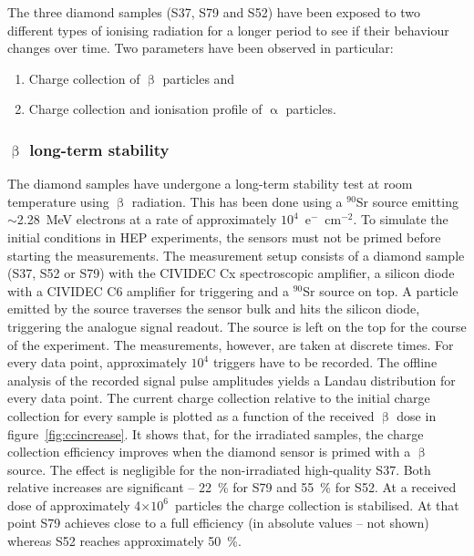The three diamond samples (S37, S79 and S52) have been exposed to two different types of ionising radiation for a longer period to see if their behaviour changes over time. Two parameters have been observed in particular: 
\begin{enumerate}
\item Charge collection of $\upbeta$ particles and 
\item Charge collection and ionisation profile of $\upalpha$ particles.
\end{enumerate}

\subsubsection{$\upbeta$ long-term stability}
The diamond samples have undergone a long-term stability test at room temperature using $\upbeta$ radiation. This has been done using a $^{90}$Sr source emitting $\sim$2.28~MeV electrons at a rate of approximately $10^4$~e$^-$~cm$^{-2}$. To simulate the initial conditions in HEP experiments, the sensors must not be primed before starting the measurements. The measurement setup consists of a diamond sample (S37, S52 or S79) with the CIVIDEC Cx spectroscopic amplifier, a silicon diode with a CIVIDEC C6 amplifier for triggering and a $^{90}$Sr source on top. A particle emitted by the source traverses the sensor bulk and hits the silicon diode, triggering the analogue signal readout. The source is left on the top for the course of the experiment. The measurements, however, are taken at discrete times. For every data point, approximately $10^4$ triggers have to be recorded. The offline analysis of the recorded signal pulse amplitudes yields a Landau distribution for every data point. The current charge collection relative to the initial charge collection for every sample is plotted as a function of the received $\upbeta$ dose in figure~\ref{fig:ccincrease}. It shows that, for the irradiated samples, the charge collection efficiency improves when the diamond sensor is primed with a $\upbeta$ source. The effect is negligible for the non-irradiated high-quality S37. Both relative increases are significant -- 22~\% for S79 and 55~\% for S52. At a received dose of approximately 4$\times10^6$~particles the charge collection is stabilised. At that point S79 achieves close to a full efficiency (in absolute values -- not shown) whereas S52 reaches approximately 50~\%.

